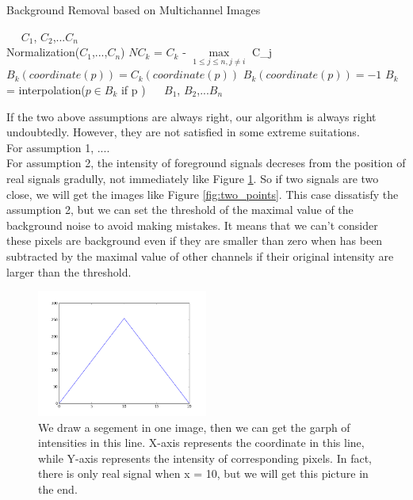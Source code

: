 \documentclass{article}
\begin{document}
\begin{algorithm}[htb]    %
	\caption{Background Removal based on Multichannel Images}   %
	\label{alg:Framwork}       %
	\begin{algorithmic}[1]     %
		\REQUIRE ~~ $C_1$, $C_2$,...$C_n$\\
		\STATE Normalization($C_1$,...,$C_n$)                          %
			$NC_k$ = $C_k$ - $\max\limits_{1 \leq j \leq n, j\neq i}$ C_j
		\ENDFOR
					$B_k(coordinate(p)) = C_k(coordinate(p))$
				\ELSE
					$B_k(coordinate(p)) = -1$
				\ENDIF
			\ENDFOR
		\ENDFOR
			$B_k$ = interpolation($p \in B_k $ if p )
		\ENDFOR
		\ENSURE ~~ $B_1$, $B_2$,...$B_n$\\                           %
		\end{algorithmic}
	\end{algorithm}
If the two above assumptions are always right, our algorithm is always right undoubtedly. However, they are not satisfied in some extreme suitations.\\
For assumption 1, ....\\
For assumption 2, the intensity of foreground signals decreses from the position of real signals gradully, not immediately like Figure \ref{fig:single}. So if two signals are two close, we will get the images like Figure \ref{fig:two_points}. This case dissatisfy the assumption 2, but we can set the threshold of the maximal value of the background noise to avoid making mistakes. It means that we can't consider these pixels are background even if they are smaller than zero when has been subtracted by the maximal value of other channels if their original intensity are larger than the threshold.
\begin{figure}
	\includegraphics[width=0.5\textwidth]{figure_1.png}
	\caption{We draw a segement in one image, then we can get the garph of intensities in this line. X-axis represents the coordinate in this line, while Y-axis represents the intensity of corresponding pixels. In fact, there is only real signal when x = 10, but we will get this picture in the end.}
	\label{fig:single}
\end{figure}
\end{document}
